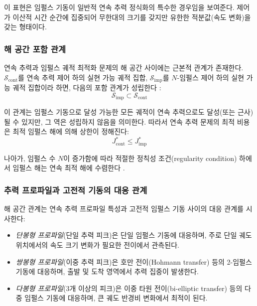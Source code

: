 \documentclass[a4paper,fleqn]{cas-dc}
\begin{document}
이 표현은 임펄스 기동이 일반적 연속 추력 정식화의 특수한 경우임을 보여준다. 제어가 이산적 시간 순간에 집중되어 무한대의 크기를 갖지만 유한한 적분값(속도 변화)을 갖는 형태이다.

\subsubsection{해 공간 포함 관계}

연속 추력과 임펄스 궤적 최적화 문제의 해 공간 사이에는 근본적 관계가 존재한다. $\mathcal{S}_{\text{cont}}$를 연속 추력 제어 하의 실현 가능 궤적 집합, $\mathcal{S}_{\text{imp}}$를 $N$-임펄스 제어 하의 실현 가능 궤적 집합이라 하면, 다음의 포함 관계가 성립한다 \citep{Taheri2020}:
\begin{equation}\label{eq:solution_space}
\mathcal{S}_{\text{imp}} \subset \mathcal{S}_{\text{cont}}
\end{equation}

이 관계는 임펄스 기동으로 달성 가능한 모든 궤적이 연속 추력으로도 달성(또는 근사)될 수 있지만, 그 역은 성립하지 않음을 의미한다. 따라서 연속 추력 문제의 최적 비용은 최적 임펄스 해에 의해 상한이 정해진다:
\begin{equation}
J^*_{\text{cont}} \leq J^*_{\text{imp}}
\end{equation}

나아가, 임펄스 수 $N$이 증가함에 따라 적절한 정칙성 조건(regularity condition) 하에서 임펄스 해는 연속 최적 해에 수렴한다 \citep{Prussing2010}.

\subsubsection{추력 프로파일과 고전적 기동의 대응 관계}

해 공간 관계는 연속 추력 프로파일 특성과 고전적 임펄스 기동 사이의 대응 관계를 시사한다:

\begin{itemize}
\item \textit{단봉형 프로파일}(단일 추력 피크)은 단일 임펄스 기동에 대응하며, 주로 단일 궤도 위치에서의 속도 크기 변화가 필요한 전이에서 관측된다.

\item \textit{쌍봉형 프로파일}(이중 추력 피크)은 호만 전이(Hohmann transfer) 등의 2-임펄스 기동에 대응하며, 출발 및 도착 영역에서 추력 집중이 발생한다.

\item \textit{다봉형 프로파일}(3개 이상의 피크)은 이중 타원 전이(bi-elliptic transfer) 등의 다중 임펄스 기동에 대응하며, 큰 궤도 반경비 변화에서 최적이 된다.
\end{itemize}
\end{document}
